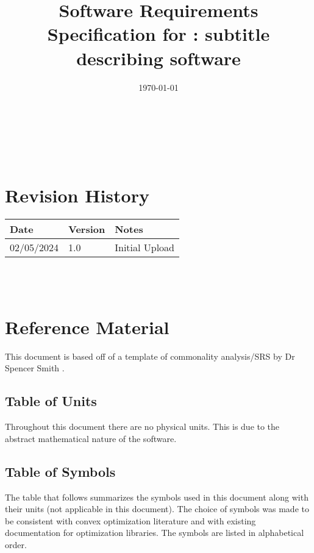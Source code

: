 \documentclass[12pt]{article}
\begin{document}
\title{Software Requirements Specification for \progname: subtitle describing software} 
\author{\authname}
\date{\today}
	
\maketitle

~\newpage


\tableofcontents

~\newpage

\section*{Revision History}

\begin{tabularx}{\textwidth}{p{3cm}p{2cm}X}
\toprule {\bf Date} & {\bf Version} & {\bf Notes}\\
\midrule
02/05/2024 & 1.0 & Initial Upload\\
\bottomrule
\end{tabularx}

~\\

~\newpage

\section{Reference Material}

This document is based off of a template of commonality analysis/SRS by Dr Spencer Smith \citep{Ssmith}.

\subsection{Table of Units}

Throughout this document there are no physical units. This is due to the abstract mathematical nature of the software. 

\subsection{Table of Symbols}

The table that follows summarizes the symbols used in this document along with
their units (not applicable in this document).  The choice of symbols was made to be consistent with convex optimization literature and with existing documentation for optimization libraries.  The symbols are listed in alphabetical order.
\end{document}
